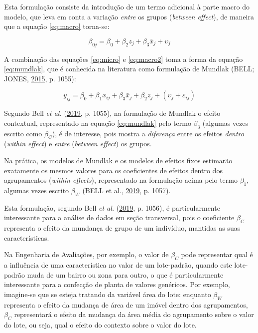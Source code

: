 \documentclass[
  a4paper, 11pt]{article}
\begin{document}
Esta formulação consiste da introdução de um termo adicional à parte
macro do modelo, que leva em conta a variação \emph{entre} os grupos
(\emph{between effect}), de maneira que a equação \ref{eq:macro}
torna-se:

\begin{equation} \label{eq:macro2}
\beta_{0j} = \beta_0 + \beta_2 z_{j} + \beta_3 \bar{x}_j + \upsilon_{j} 
\end{equation}

A combinação das equações \ref{eq:micro} e \ref{eq:macro2} toma a forma
da equação \ref{eq:mundlak}, que é conhecida na literatura como
formulação de Mundlak (BELL; JONES,
\protect\hyperlink{ref-bell2015}{2015}, p. 1055):

\begin{equation} \label{eq:mundlak}
y_{ij} = \beta_0 + \beta_{1} x_{ij} + \beta_{3}\bar{x}_j+ \beta_2 z_j + (\upsilon_j + \varepsilon_{ij}) 
\end{equation}

Segundo Bell \emph{et al.} (\protect\hyperlink{ref-bell2019}{2019}, p.
1055), na formulação de Mundlak o efeito contextual, representado na
equação \ref{eq:mundlak} pelo termo \(\beta_{3}\) (algumas vezes escrito
como \(\beta_{C}\)), é de interesse, pois mostra a \emph{diferença}
entre os efeitos \emph{dentro} (\emph{within effect}) e \emph{entre}
(\emph{between effect}) os grupos.

Na prática, os modelos de Mundlak e os modelos de efeitos fixos
estimarão exatamente os mesmos valores para os coeficientes de efeitos
dentro dos agrupamentos (\emph{within effects}), representado na
formulação acima pelo termo \(\beta_1\), algumas vezes escrito
\(\beta_{W}\) (BELL et al., \protect\hyperlink{ref-bell2019}{2019}, p.
1057).

Esta formulação, segundo Bell \emph{et al.}
(\protect\hyperlink{ref-bell2019}{2019}, p. 1056), é particularmente
interessante para a análise de dados em seção transversal, pois o
coeficiente \(\beta_C\) representa o efeito da mundança de grupo de um
indivíduo, mantidas as suas características.

Na Engenharia de Avaliações, por exemplo, o valor de \(\beta_C\) pode
representar qual é a influência de uma característica no valor de um
lote-padrão, quando este lote-padrão muda de um bairro ou zona para
outro, o que é particularmente interessante para a confecção de planta
de valores genéricos. Por exemplo, imagine-se que se esteja tratando da
variável área do lote: enquanto \(\beta_W\) representa o efeito da
mudança de área de um imóvel dentro dos agrupamentos, \(\beta_C\)
representará o efeito da mudança da área média do agrupamento sobre o
valor do lote, ou seja, qual o efeito do contexto sobre o valor do lote.
\end{document}
